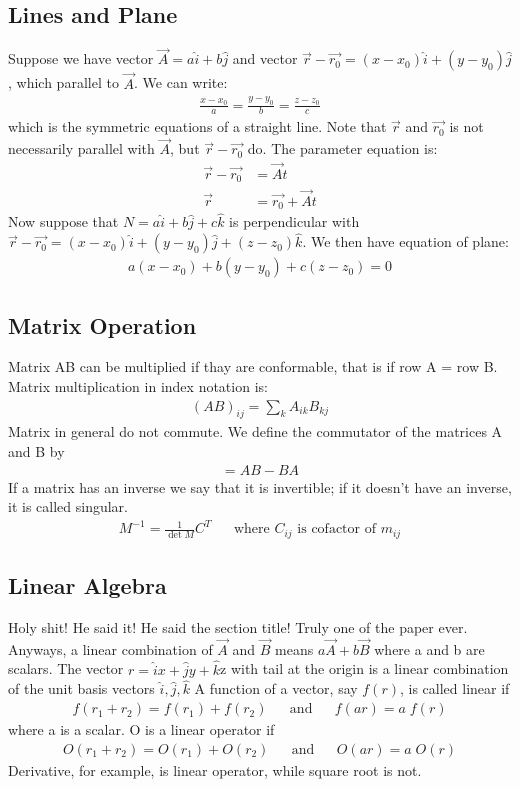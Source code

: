 \documentclass[../main.tex]{subfiles}
\begin{document}
\subsection*{Lines and Plane}
Suppose we have vector $\vec{A}=a\hat{i}+b\hat{j}$ and vector $\vec{r}-\vec{r_0}=(x-x_0)\hat{i}+(y-y_0)\hat{j}$, which parallel to $\vec{A}$.
We can write:
\begin{align*}
    \frac{x-x_0}{a}=\frac{y-y_0}{b}=\frac{z-z_0}{c}
\end{align*}
which is the symmetric equations of a straight line. 
Note that $\vec{r}$ and $\vec{r_0}$ is not necessarily parallel with $\vec{A}$, but $\vec{r}-\vec{r_0}$ do.
The parameter equation is:
\begin{align*}
    \vec{r}-\vec{r_0}&=\vec{A}t\\
    \vec{r}&=\vec{r_0}+\vec{A}t
\end{align*}
Now suppose that $N=a\hat{i}+b\hat{j}+c\hat{k}$ is perpendicular with $\vec{r}-\vec{r_0}=(x-x_0)\hat{i}+(y-y_0)\hat{j}+(z-z_0)\hat{k}$.
We then have equation of plane:
\begin{align*}
    a(x-x_0)+b(y-y_0)+c(z-z_0)=0
\end{align*}

\subsection*{Matrix Operation}
Matrix AB can be multiplied if thay are conformable, that is if row A = row B. 
Matrix multiplication in index notation is:
\begin{align*}
    (AB)_{ij}=\sum_{k}A_{ik}B_{kj}
\end{align*}
Matrix in general do not commute. We define the commutator of the matrices A and B by
\begin{align*}
    [A, B] = AB - BA
\end{align*}
If a matrix has an inverse we say that it is invertible; if it doesn't have an inverse, it is called singular. 
\begin{align*}
    M^{-1}=\frac{1}{\det M}C^{T}&&\text{where $C_{ij}$ is cofactor of $m_{ij}$}
\end{align*}


\subsection*{Linear Algebra}
Holy shit! He said it! He said the section title! Truly one of the paper ever. 
Anyways, a linear combination of $\vec{A}$ and $\vec{B}$ means $a\vec{A} + b\vec{B}$ where a and b are scalars.
The vector $r = \hat{i}x + \hat{j}y + \hat{k}$z with tail at the origin is a linear combination of the unit basis vectors $\hat{i}, \hat{j}, \hat{k}$
A function of a vector, say $f (r)$, is called linear if
\begin{align*}
    f(r_1+r_2)= f(r_1)+ f(r_2)&&\mathrm{and}&&f(ar)=a\;f(r)
\end{align*}
where a is a scalar. O is a linear operator if
\begin{align*}
    O(r_1+r_2)= O(r_1)+ O(r_2)&&\mathrm{and}&&O(ar)=a\;O(r)
\end{align*}
Derivative, for example, is linear operator, while square root is not.
\end{document}
